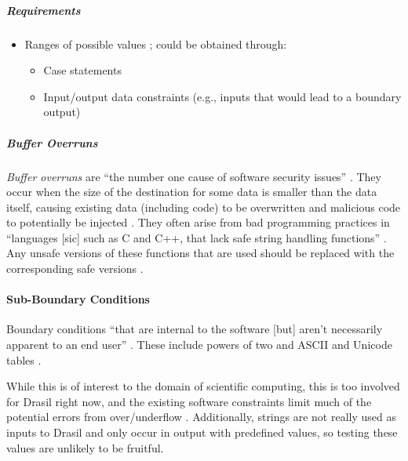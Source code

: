 \subparagraph{Requirements}
\begin{itemize}
      \item Ranges of possible values \cite[p.~67, 73]{patton_software_2006};
            could be obtained through:
            \begin{itemize}
                  \item Case statements
                  \item Input/output data constraints (e.g., inputs that
                        would lead to a boundary output)
            \end{itemize}
\end{itemize}

\subparagraph{Buffer Overruns \cite[pp.~201-205]{patton_software_2006}}

\emph{Buffer overruns} are ``the number one cause of software security issues''
\cite[p.~75]{patton_software_2006}. They occur when the size of the destination
for some data is smaller than the data itself, causing existing data (including
code) to be overwritten and malicious code to potentially be injected
\cite[p.~202, 204-205]{patton_software_2006}. They often arise from bad
programming practices in ``languages [sic] such as C and C++, that lack safe
string handling functions'' \cite[p.~201]{patton_software_2006}. Any unsafe
versions of these functions that are used should be replaced with the
corresponding safe versions \cite[pp.~203-204]{patton_software_2006}.

\paragraph{Sub-Boundary Conditions \cite[pp.~75-77]{patton_software_2006}}
\label{sub-bound-conds}

Boundary conditions ``that are internal to the software [but] aren't necessarily
apparent to an end user'' \cite[p.~75]{patton_software_2006}. These include
powers of two \cite[pp.~75-76]{patton_software_2006} and ASCII and Unicode tables
\cite[pp.~76-77]{patton_software_2006}.

While this is of interest to the domain of scientific computing, this is too
involved for Drasil right now, and the existing software constraints limit much
of the potential errors from over/underflow \cite{june_11_meeting}. Additionally,
strings are not really used as inputs to Drasil and only occur in output with
predefined values, so testing these values are unlikely to be fruitful.

